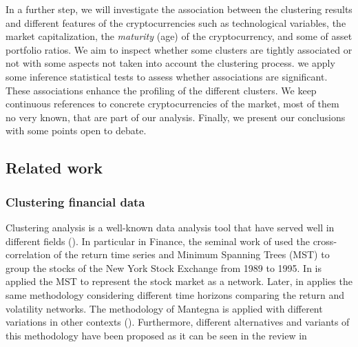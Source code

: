 \documentclass{bmcart}
\begin{document}
In a further step, we will investigate the association between the clustering results and different features of the cryptocurrencies such as technological variables, the market capitalization, the \textit{maturity} (age) of the cryptocurrency, and some of asset portfolio ratios. We aim to inspect whether some clusters are tightly associated or not with some aspects not taken into account the clustering process. we apply some inference statistical tests to assess whether associations are significant. These associations enhance the profiling of the different clusters. We keep continuous references to concrete cryptocurrencies of the market, most of them no very known,  that are part of our analysis. Finally, we present our conclusions with some points open to debate. 


\subsection*{Related work}

\subsubsection*{Clustering financial data}

Clustering analysis is a well-known data analysis tool that have served well in different fields  (\cite{ClusterAnalysisHandBookCRCPress2016}). In particular in Finance, the seminal work of  \cite{HierarchicalStructureFinancialMK1999} used the cross-correlation of the return time series and Minimum Spanning Trees (MST) to group the stocks of the New York Stock Exchange from 1989 to 1995. In \cite{HierarchicalStructureFinancialMK1999} is applied the MST to represent the stock market as a network. Later, in \cite{Bonanno_2004} applies the same methodology considering different time horizons comparing the return and volatility networks. The methodology of Mantegna is applied with different variations in other contexts (\cite{Onnela2_2003, Mizuno_2006, BridaRisso2010}). Furthermore, different alternatives and variants of this methodology have been proposed as it can be seen in the review in \cite{Gautier2017} 
\end{document}
